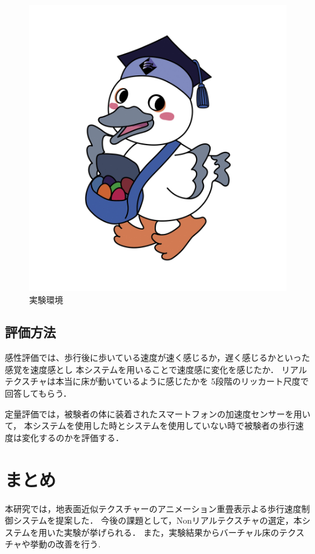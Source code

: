 \documentclass[dvipdfmx]{jsarticle}
\begin{document}
\begin{figure}[t]
    \centering
    \includegraphics[width=0.7\linewidth]{fig/koukaton.jpg}
    \caption{実験環境}
    \label{fig:kokaton}
\end{figure}

 \subsection{評価方法}
 感性評価では、歩行後に歩いている速度が速く感じるか，遅く感じるかといった感覚を速度感とし
 本システムを用いることで速度感に変化を感じたか．
 リアルテクスチャは本当に床が動いているように感じたかを
 5段階のリッカート尺度で回答してもらう．


 定量評価では，被験者の体に装着されたスマートフォンの加速度センサーを用いて，
 本システムを使用した時とシステムを使用していない時で被験者の歩行速度は変化するのかを評価する．

\section{まとめ}
本研究では，地表面近似テクスチャーのアニメーション重畳表示よる歩行速度制御システムを提案した．
今後の課題として，Nonリアルテクスチャの選定，本システムを用いた実験が挙げられる．
また，実験結果からバーチャル床のテクスチャや挙動の改善を行う.


\end{document}
